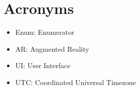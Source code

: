 \documentclass[a4paper, 12pt]{article}
\begin{document}
\section{Acronyms}

\begin{itemize}
    \item{Enum: Enumerator}
    
    \item{AR: Augmented Reality}
    
    \item{UI: User Interface}
    
    \item{UTC: Coordinated Universal Timezone}
\end{itemize}

\printbibliography
\end{document}
